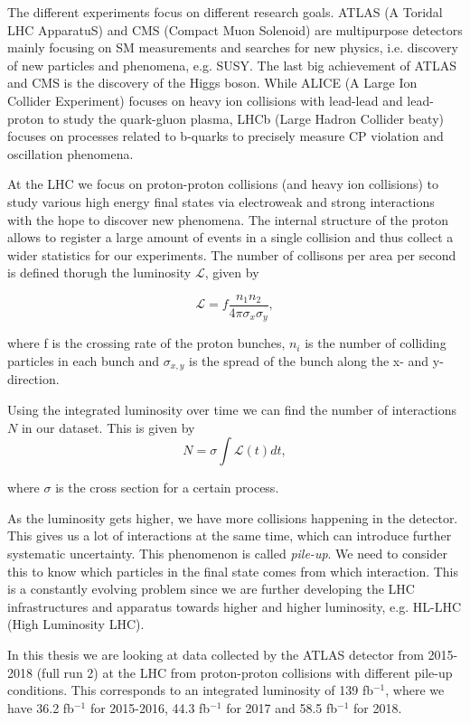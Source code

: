 The different experiments focus on different research goals. ATLAS (A Toridal LHC ApparatuS) and CMS (Compact
Muon Solenoid) are multipurpose detectors mainly focusing on SM measurements and searches for new physics, i.e. discovery of new particles and phenomena, e.g. SUSY. The last big achievement of ATLAS and CMS is the discovery of the Higgs boson. While ALICE (A Large Ion Collider Experiment) focuses on heavy ion collisions with lead-lead and lead-proton to study the quark-gluon plasma, LHCb (Large Hadron Collider beaty) focuses on processes related to b-quarks to precisely measure CP violation and oscillation phenomena. 

At the LHC we focus on proton-proton collisions (and heavy ion collisions) to study various high energy final states via electroweak and strong interactions with the hope to discover new phenomena. The internal structure of the proton allows to register a large amount of events in a single collision and thus collect a wider statistics for our experiments. The number of collisons per area per second is defined thorugh the luminosity $\mathscr{L}$, given by

\begin{equation}
    \label{eq:lumi}
    \mathscr{L} = f \frac{n_1 n_2}{4 \pi \sigma_x \sigma_y},
\end{equation}

where f is the crossing rate of the proton bunches, $n_i$ is the number of colliding particles in each bunch and $\sigma_{x,y}$ is the spread of the bunch along the x- and y-direction.  

Using the integrated luminosity over time we can find the number of interactions $N$ in our dataset. This is given by  
\begin{equation}
    \label{eq:intLumi}
    N = \sigma \int \mathscr{L}(t) dt, 
\end{equation}

where $\sigma$ is the cross section for a certain process. 

As the luminosity gets higher, we have more collisions happening in the detector. This gives us a lot of interactions at the same time, which can introduce further systematic uncertainty. This phenomenon is called \textit{pile-up}. We need to consider this to know which particles in the final state comes from which interaction. This is a constantly evolving problem since we are further developing the LHC infrastructures and apparatus towards higher and higher luminosity, e.g. HL-LHC (High Luminosity LHC). 

In this thesis we are looking at data collected by the ATLAS detector from 2015-2018 (full run 2) at the LHC from proton-proton collisions with different pile-up conditions. This corresponds to an integrated luminosity of 139 fb$^{-1}$, where we have 36.2 fb$^{-1}$ for 2015-2016, 44.3 fb$^{-1}$ for 2017 and 58.5 fb$^{-1}$ for 2018.




 





